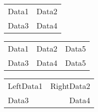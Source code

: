 \documentclass[10pt,a4paper]{article}
\begin{document}
	
	\onehalfspacing
	
	
	\begin{center}
		
		
		\begin{tabular}{cc}
			Data1 & Data2 \\
			Data3 & Data4
		\end{tabular}
		
		\vspace{0.5cm}
		
		
		
		\begin{tabular}{ccc}
			Data1 & Data2 & Data5 \\
			Data3 & Data4 & Data5
		\end{tabular}	
		
		\vspace{0.5cm}
		


		
		\begin{tabular}{lr} 
			
			LeftData1 & 	RightData2 \\
			Data3  	 & 	Data4 \\
			
			
		\end{tabular}
		
		\vspace{0.5cm}	
		

\end{center}
\end{document}
